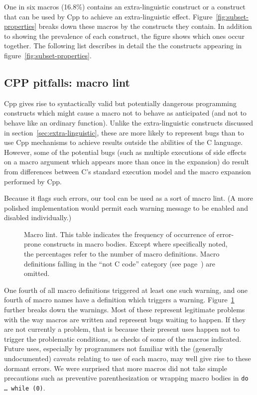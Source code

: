 \documentclass[10pt]{article}
\begin{document}
One in six macros (16.8\%) contains an extra-linguistic construct or a
construct that can be used by Cpp to achieve an extra-linguistic effect.
Figure~\ref{fig:subset-properties} breaks down these macros by the
constructs they contain.  In addition to showing the prevalence of each
construct, the figure shows which ones occur together.  The following list
describes in detail the the constructs appearing in
figure~\ref{fig:subset-properties}.

{}



\subsection{CPP pitfalls:  macro lint}
\label{sec:lint}

Cpp gives rise to syntactically valid but potentially dangerous programming
constructs which might cause a macro not to behave as anticipated (and not
to behave like an ordinary function).  Unlike the extra-linguistic
constructs discussed in section~\ref{sec:extra-linguistic}, these are more
likely to represent bugs than to use Cpp mechanisms to achieve results
outside the abilities of the C language.  However, some of the potential
bugs (such as multiple executions of side effects on a macro argument
which appears more than once in the expansion) do
result from differences between C's standard execution model and the
macro expansion performed by Cpp.

Because it flags such errors, our tool can be used as a sort of macro lint.
(A more polished implementation would permit each warning message to be
enabled and disabled individually.)

\begin{figure}
  {\small\centerline{}}
  
  \caption{Macro lint.  This table indicates the frequency of occurrence of
    error-prone constructs in macro bodies.  Except where specifically
    noted, the percentages refer to the number of macro definitions.  Macro
    definitions falling in the ``not C code'' category (see
    page~\pageref{page:not-c-code}) are omitted.}
  \label{fig:macro-lint}
\end{figure}

One fourth of all macro definitions triggered at least one such warning,
and one fourth of macro names have a definition which triggers a warning.
Figure~\ref{fig:macro-lint} further breaks down the warnings.  Most of
these represent legitimate problems with the way macros are written and
represent bugs waiting to happen.  If they are not currently a problem,
that is because their present uses happen not to trigger the problematic
conditions, as checks of some of the macros indicated.  Future uses,
especially by programmers not familiar with the (generally undocumented)
caveats relating to use of each macro, may well give rise to these dormant
errors.  We were surprised that more macros did not take simple precautions
such as preventive parenthesization or wrapping macro bodies in {\tt do
{\rm \ldots} while (0)}.
\end{document}
